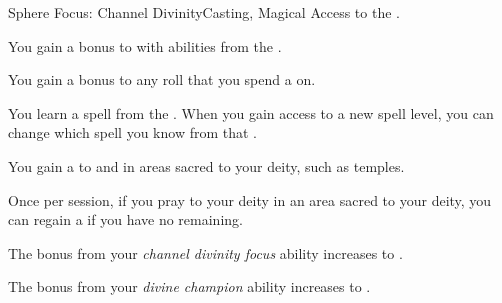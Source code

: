     \begin{feat}{Sphere Focus: Channel Divinity}{Casting, Magical}
        \featpre Access to the  .

         You gain a  bonus to  with abilities from the  .

         You gain a  bonus to any roll that you spend a  on.

         You learn a spell from the  .
        When you gain access to a new spell level, you can change which spell you know from that .

         You gain a   to  and  in areas sacred to your deity, such as temples.

         Once per session, if you pray to your deity in an area sacred to your deity, you can regain a  if you have no  remaining.

         The bonus from your \textit{channel divinity focus} ability increases to .

         The bonus from your \textit{divine champion} ability increases to .
    \end{feat}

